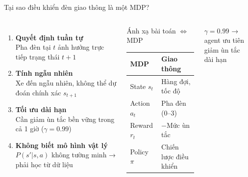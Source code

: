 \begin{frame}{Tại sao điều khiển đèn giao thông là một MDP?}
  \begin{columns}[T]
    \begin{enumerate}
      \setlength{\itemsep}{6pt}
      \item \textbf{Quyết định tuần tự}\\
            Pha đèn tại $t$ ảnh hưởng trực tiếp trạng thái $t+1$
      \item \textbf{Tính ngẫu nhiên}\\
            Xe đến ngẫu nhiên, không thể dự đoán chính xác $s_{t+1}$
      \item \textbf{Tối ưu dài hạn}\\
            Cần giảm ùn tắc bền vững trong cả 1 giờ ($\gamma=0.99$)
      \item \textbf{Không biết mô hình vật lý}\\
            $P(s'|s,a)$ không tường minh → phải học từ dữ liệu
    \end{enumerate}

    \begin{block}{Ánh xạ bài toán $\Leftrightarrow$ MDP}
      \begin{center}
      \begin{tabular}{ll}
        \toprule
        \textbf{MDP} & \textbf{Giao thông}\\
        \midrule
        State $s_t$   & Hàng đợi, tốc độ\\
        Action $a_t$  & Pha đèn (0--3)\\
        Reward $r_t$  & $-$Mức ùn tắc\\
        Policy $\pi$  & Chiến lược điều khiển\\
        \bottomrule
      \end{tabular}
      \end{center}
    \end{block}
    \vspace{6pt}
    \begin{exampleblock}{}
      \centering$\gamma = 0.99$ → agent ưu tiên\\giảm ùn tắc dài hạn
    \end{exampleblock}
  \end{columns}
\end{frame}

